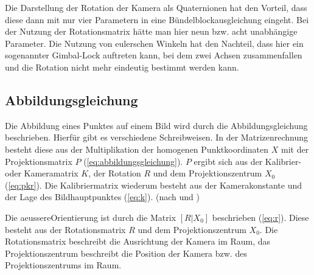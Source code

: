 \documentclass[./00PhotoBox.tex]{subfiles}
\begin{document}
Die Darstellung der Rotation der Kamera als Quaternionen hat den Vorteil, dass diese dann mit nur vier Parametern in eine Bündelblockausgleichung eingeht. Bei der Nutzung der Rotationsmatrix hätte man hier neun bzw. acht unabhängige Parameter. Die Nutzung von eulerschen Winkeln hat den Nachteil, dass hier ein sogenannter Gimbal-Lock auftreten kann, bei dem zwei Achsen zusammenfallen und die Rotation nicht mehr eindeutig bestimmt werden kann. \citep[S. 63]{luhmann}

\subsection{Abbildungsgleichung}
\label{ss:abbildungsgleichung}
Die Abbildung eines Punktes auf einem Bild wird durch die Abbildungsgleichung beschrieben. Hierfür gibt es verschiedene Schreibweisen. In der Matrizenrechnung besteht diese aus der Multiplikation der homogenen Punktkoordinaten $X$ mit der Projektionsmatrix $P$ (\autoref{eq:abbildungsgleichung}). $P$ ergibt sich aus der Kalibrier- oder Kameramatrix $K$, der Rotation $R$ und dem Projektionszentrum $X_0$ (\autoref{eq:pkr}). Die Kalibriermatrix wiederum besteht aus der \Gls{Kamerakonstante} und der Lage des \Gls{Bildhauptpunkt}es (\autoref{eq:k}).
(nach \citealp[S. 244]{hartley} und \citealp[S. 290]{luhmann})

Die \gls{aeussereOrientierung} ist durch die Matrix $[R|X_0]$ beschrieben (\autoref{eq:r}). Diese besteht aus der Rotationsmatrix $R$ und dem Projektionszentrum $X_0$. Die Rotationsmatrix beschreibt die Ausrichtung der Kamera im Raum, das Projektionszentrum beschreibt die Position der Kamera bzw. des Projektionszentrums im Raum.
\end{document}
